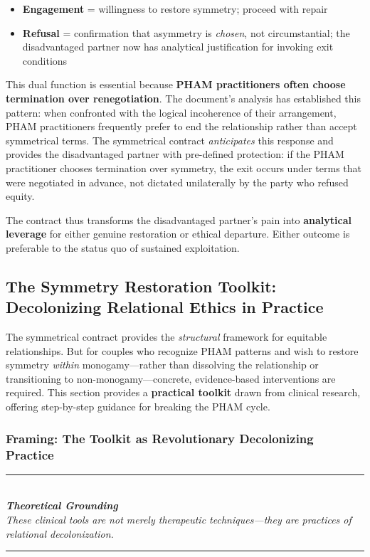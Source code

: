 \documentclass[12pt, letterpaper]{article}
\begin{document}
\begin{itemize}
    \item \textbf{Engagement} = willingness to restore symmetry; proceed with repair
    \item \textbf{Refusal} = confirmation that asymmetry is \textit{chosen}, not circumstantial; the disadvantaged partner now has analytical justification for invoking exit conditions
\end{itemize}

This dual function is essential because \textbf{PHAM practitioners often choose termination over renegotiation}. The document's analysis has established this pattern: when confronted with the logical incoherence of their arrangement, PHAM practitioners frequently prefer to end the relationship rather than accept symmetrical terms. The symmetrical contract \textit{anticipates} this response and provides the disadvantaged partner with pre-defined protection: if the PHAM practitioner chooses termination over symmetry, the exit occurs under terms that were negotiated in advance, not dictated unilaterally by the party who refused equity.

The contract thus transforms the disadvantaged partner's pain into \textbf{analytical leverage} for either genuine restoration or ethical departure. Either outcome is preferable to the status quo of sustained exploitation.

\subsection{The Symmetry Restoration Toolkit: Decolonizing Relational Ethics in Practice}

The symmetrical contract provides the \textit{structural} framework for equitable relationships. But for couples who recognize PHAM patterns and wish to restore symmetry \textit{within} monogamy---rather than dissolving the relationship or transitioning to non-monogamy---concrete, evidence-based interventions are required. This section provides a \textbf{practical toolkit} drawn from clinical research, offering step-by-step guidance for breaking the PHAM cycle.

\subsubsection{Framing: The Toolkit as Revolutionary Decolonizing Practice}

\begin{center}
\rule{0.6\textwidth}{0.4pt}\\[0.5em]
\textit{\textbf{Theoretical Grounding}}\\[0.3em]
\textit{These clinical tools are not merely therapeutic techniques---they are practices of relational decolonization.}\\[0.5em]
\rule{0.6\textwidth}{0.4pt}
\end{center}
\end{document}
